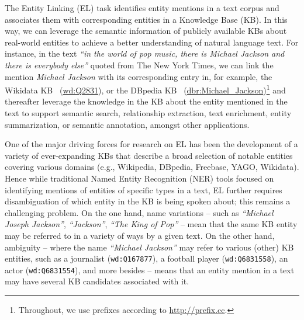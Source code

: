 \documentclass{llncs}
\begin{document}

The Entity Linking (EL) task identifies entity mentions in a text corpus and associates them with corresponding entities in a Knowledge Base (KB). In this way, we can leverage the semantic information of publicly available KBs about real-world entities to achieve a better understanding of natural language text. For instance, in the text \textit{``in the world of pop music, there is Michael Jackson and there is everybody else''} quoted from The New York Times, we can link the mention \textit{Michael Jackson} with its corresponding entry in, for example, the Wikidata KB~\cite{Wikidata_vrandevcic2014wikidata} (\url{wd:Q2831}), or the DBpedia KB~\cite{dbpedia-lehmann2015dbpedia} (\url{dbr:Michael_Jackson})\footnote{Throughout, we use prefixes according to \url{http://prefix.cc}.} and thereafter leverage the knowledge in the KB about the entity mentioned in the text to support semantic search, relationship extraction, text enrichment, entity summarization, or semantic annotation, amongst other applications.

One of the major driving forces for research on EL has been the development of a variety of ever-expanding KBs that describe a broad selection of notable entities covering various domains (e.g., Wikipedia, DBpedia, Freebase, YAGO, Wikidata). Hence while traditional Named Entity Recognition (NER) tools focused on identifying mentions of entities of specific types in a text, EL further requires disambiguation of which entity in the KB is being spoken about; this remains a challenging problem. On the one hand, name variations -- such as \textit{``Michael Joseph Jackson''}, \textit{``Jackson''}, \textit{``The King of Pop''} -- mean that the same KB entity may be referred to in a variety of ways by a given text. On the other hand, ambiguity -- where the name \textit{``Michael Jackson''} may refer to various (other) KB entities, such as a journalist (\texttt{wd:Q167877}), a football player (\texttt{wd:Q6831558}), an actor (\texttt{wd:Q6831554}), and more besides -- means that an entity mention in a text may have several KB candidates associated with it.
\end{document}

